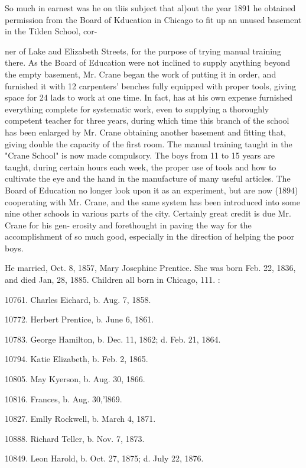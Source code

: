 \documentclass{book}
\begin{document}
So much in earnest was he on tliis subject that al)out the year 
1891 he obtained permission from the Board of Kducation in 
Chicago to fit up an unused basement in the Tilden School, cor- 




ner of Lake aud Elizabeth Streets, for the purpose of trying 
manual training there. As the Board of Education were not 
inclined to supply anything beyond the empty basement, Mr. 
Crane began the work of putting it in order, and furnished it 
with 12 carpenters' benches fully equipped with proper tools, 
giving space for 24 lads to work at one time. In fact, has at his 
own expense furnished everything complete for systematic work, 
even to supplying a thoroughly competent teacher for three years, 
during which time this branch of the school has been enlarged by 
Mr. Crane obtaining another basement and fitting that, giving 
double the capacity of the first room. The manual training 
taught in the "Crane School" is now made compulsory. The 
boys from 11 to 15 years are taught, during certain hours each 
week, the proper use of tools and how to cultivate the eye and 
the hand in the manufacture of many useful articles. The Board 
of Education no longer look upon it as an experiment, but are 
now (1894) cooperating with Mr. Crane, and the same system 
has been introduced into some nine other schools in various parts 
of the city. Certainly great credit is due Mr. Crane for his gen- 
erosity and forethought in paving the way for the accomplishment 
of so much good, especially in the direction of helping the poor 
boys. 

He married, Oct. 8, 1857, Mary Josephine Prentice. She was 
born Feb. 22, 1836, and died Jan, 28, 1885. Children all born 
in Chicago, 111. : 

10761. Charles Eichard, b. Aug. 7, 1858. 

10772. Herbert Prentice, b. June 6, 1861. 

10783. George Hamilton, b. Dec. 11, 1862; d. Feb. 21, 1864. 

10794. Katie Elizabeth, b. Feb. 2, 1865. 

10805. May Kyerson, b. Aug. 30, 1866. 

10816. Frances, b. Aug. 30,'l869. 

10827. Emlly Rockwell, b. March 4, 1871. 

10888. Richard Teller, b. Nov. 7, 1873. 

10849. Leon Harold, b. Oct. 27, 1875; d. July 22, 1876. 
\end{document}

